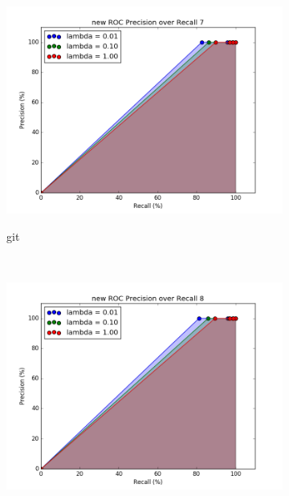 \documentclass[12pt]{article}
\begin{document}
\begin{figure}[h!]
            \begin{subfigure}[t]{0.5\textwidth}
        \centering
        \includegraphics[width=1.\textwidth]{graphs/problem4_ROC7}
        \caption{}git 
    \end{subfigure}%
    ~ 
    \begin{subfigure}[t]{0.5\textwidth}
        \centering
        \includegraphics[width=1.\textwidth]{graphs/problem4_ROC8}
        \caption{}
    \end{subfigure}%
\end{figure}
\end{document}
